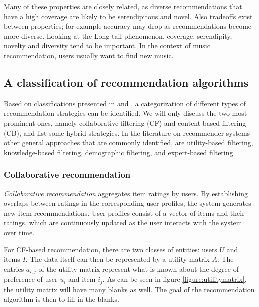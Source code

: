 Many of these properties are closely related, as diverse recommendations that have a high coverage are likely to be serendipitous and novel. Also tradeoffs exist between properties; for example accuracy may drop as recommendations become more diverse\cite{shani:2011:9780387858197}. Looking at the Long-tail phenomenon, coverage, serendipity, novelty and diversity tend to be important. In the context of music recommendation, users usually want to find new music\cite{levy:2010}.


\subsection{A classification of recommendation algorithms}\label{chapter:literature_study:section:computer:subsection:algorithms}

Based on classifications presented in \cite{burke:2002} and \cite{celma:2008:phd}, a categorization of different types of recommendation strategies can be identified. We will only discuss the two most prominent ones, namely collaborative filtering (CF) and content-based filtering (CB)\cite{herlocker:2000, rajaraman:2012}, and list some hybrid strategies. In the literature on recommender systems other general approaches that are commonly identified, are utility-based filtering, knowledge-based filtering, demographic filtering, and expert-based filtering\cite{bostandjiev:2012, burke:2002, song:2012}.


\subsubsection{Collaborative recommendation}\label{chapter:literature_study:section:computer:subsection:algorithms:subsubsection:cf}

\emph{Collaborative recommendation} aggregates item ratings by users. By establishing overlaps between ratings in the corresponding user profiles, the system generates new item recommendations\cite{burke:2002, herlocker:2000}. User profiles consist of a vector of items and their ratings, which are continuously updated as the user interacts with the system over time\cite{burke:2002}.

For CF-based recommendation, there are two classes of entities: users $U$ and items $I$. The data itself can then be represented by a utility matrix $A$. The entries $a_{i,j}$ of the utility matrix represent what is known about the degree of preference of user $u_{i}$ and item $i_{j}$\cite{rajaraman:2012}. As can be seen in figure \ref{figure:utilitymatrix}, the utility matrix will have many blanks as well. The goal of the recommendation algorithm is then to fill in the blanks\cite{rajaraman:2012}.

